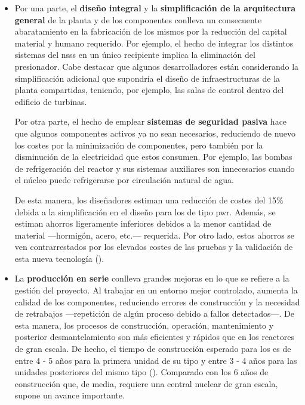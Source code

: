 \begin{itemize}
  \item Por una parte, el \textbf{diseño integral} y la \textbf{simplificación de la arquitectura general} de la planta y de los componentes conlleva un consecuente abaratamiento en la fabricación de los mismos por la reducción del capital material y humano requerido. Por ejemplo, el hecho de integrar los distintos sistemas del \acrshort{nsss} en un único recipiente implica la eliminación del presionador. Cabe destacar que algunos desarrolladores están considerando la simplificación adicional que supondría el diseño de infraestructuras de la planta compartidas, teniendo, por ejemplo, las salas de control dentro del edificio de turbinas.
  
  Por otra parte, el hecho de emplear \textbf{sistemas de seguridad pasiva} hace que algunos componentes activos ya no sean necesarios, reduciendo de nuevo los costes por la minimización de componentes, pero también por la disminución de la electricidad que estos consumen. Por ejemplo, las bombas de refrigeración del reactor y sus sistemas auxiliares son innecesarios cuando el núcleo puede refrigerarse por circulación natural de agua. 
  
  De esta manera, los diseñadores estiman una reducción de costes del 15\% debida a la simplificación en el diseño para los  de tipo \acrshort{pwr}. Además, se estiman ahorros ligeramente inferiores debidos a la menor cantidad de material ---hormigón, acero, etc.--- requerida. Por otro lado, estos ahorros se ven contrarrestados por los elevados costes de las pruebas y la validación de esta nueva tecnología (\cite{nea_market_potential}).

  \item La \textbf{producción en serie} conlleva grandes mejoras en lo que se refiere a la gestión del proyecto. Al trabajar en un entorno mejor controlado, aumenta la calidad de los componentes, reduciendo errores de construcción y la necesidad de retrabajos ---repetición de algún proceso debido a fallos detectados---. De esta manera, los procesos de construcción, operación, mantenimiento y posterior desmantelamiento son más eficientes y rápidos que en los reactores de gran escala. De hecho, el tiempo de construcción esperado para los  es de entre 4 - 5 años para la primera unidad de su tipo y entre 3 - 4 años para las unidades posteriores del mismo tipo (\cite{VEGEL2017395}). Comparado con los 6 años de construcción que, de media, requiere una central nuclear de gran escala, supone un avance importante. 
  

\end{itemize}

